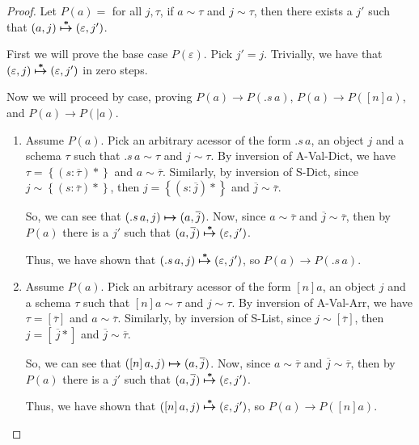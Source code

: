 \documentclass[11pt]{article}
\newcommand{\jarr}[1]{\left[#1\right]}   %
\newcommand{\jobj}[1]{\left\{#1\right\}} %
\newcommand{\matches}[2]{{#1}\sim{#2}}   %
\newcommand{\aeps}{\varepsilon}          %
\newcommand{\akey}[2]{.{#1}\,{#2}}       %
\newcommand{\apipe}[1]{\mid {#1}}        %
\begin{document}
\begin{proof}

Let $P(a) =$ for all $j, \tau$, if $\matches{a}{\tau}$ and $\matches{j}{\tau}$, then there exists a $j'$ such that $\evals{(a, j)}{(\aeps, j')}$.

First we will prove the base case $P(\aeps)$. Pick $j' = j$. Trivially, we have that $\evals{(\aeps, j)}{(\aeps, j')}$ in zero steps.

Now we will proceed by case, proving $P(a) \rightarrow P(\akey{s}{a})$, 
$P(a) \rightarrow P(\jarr{n}a)$, and $P(a) \rightarrow P(\apipe{a})$.

\begin{enumerate}
\item Assume $P(a)$. Pick an arbitrary acessor of the form $\akey{s}{a}$, an object
$j$ and a schema $\tau$ such that $\matches{\akey{s}{a}}{\tau}$ and $\matches{j}{\tau}$.
By inversion of A-Val-Dict, we have $\tau = \jobj{(s: \overline{\tau})*}$ and 
$\matches{a}{\overline{\tau}}$. Similarly, by inversion of S-Dict, since 
$\matches{j}{\jobj{(s: \overline{\tau})*}}$, then $j = \jobj{(s: \overline{j})*}$ and
$\matches{\overline{j}}{\overline{\tau}}$. 

So, we can see that 
$\steps{(\akey{s}{a}, j)}{(a, \overline{j})}$. Now, since $\matches{a}{\overline{\tau}}$ 
and $\matches{\overline{j}}{\overline{\tau}}$, then by $P(a)$ there is a $j'$ such that
$\evals{(a, \overline{j})}{(\aeps, j')}$. 

Thus, we have shown that
$\evals{(\akey{s}{a}, j)}{(\aeps, j')}$, so $P(a) \rightarrow P(\akey{s}{a})$.

\item Assume $P(a)$. Pick an arbitrary acessor of the form $\jarr{n}a$, an object
$j$ and a schema $\tau$ such that $\matches{\jarr{n}a}{\tau}$ and $\matches{j}{\tau}$.
By inversion of A-Val-Arr, we have $\tau = \jarr{\overline{\tau}}$ and 
$\matches{a}{\overline{\tau}}$. Similarly, by inversion of S-List, since 
$\matches{j}{\jarr{\overline{\tau}}}$, then $j = \jarr{~\overline{j}*}$ and
$\matches{\overline{j}}{\overline{\tau}}$. 

So, we can see that 
$\steps{(\jarr{n}a, j)}{(a, \overline{j})}$. Now, since $\matches{a}{\overline{\tau}}$ 
and $\matches{\overline{j}}{\overline{\tau}}$, then by $P(a)$ there is a $j'$ such that 
$\evals{(a, \overline{j})}{(\aeps, j')}$.

Thus, we have shown that
$\evals{(\jarr{n}a, j)}{(\aeps, j')}$, so $P(a) \rightarrow P(\jarr{n}a)$.


\end{enumerate}
\end{proof}
\end{document}

